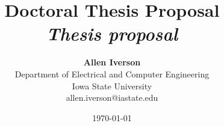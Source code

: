 \title{{\bf Doctoral Thesis Proposal} \\
	\it Thesis proposal}
\author{ {\bf Allen Iverson}  \\
	Department of Electrical and Computer Engineering  \\
	Iowa State University\\
	{\small allen.iverson@iastate.edu}
}
\date{\today}

\maketitle